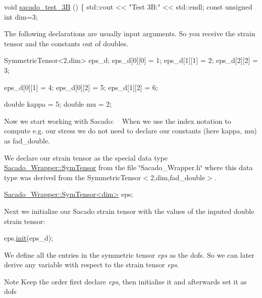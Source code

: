 \begin{DoxyCode}
\textcolor{keywordtype}{void} \hyperlink{Sacado__example_8cc_ae63cc8526935cb0512668e83cfc7b929}{sacado\_test\_3B} ()
\{
    std::cout << \textcolor{stringliteral}{"Test 3B:"} << std::endl;
    \textcolor{keyword}{const} \textcolor{keywordtype}{unsigned} \textcolor{keywordtype}{int} dim=3;
\end{DoxyCode}
 The following declarations are usually input arguments. So you receive the strain tensor and the constants out of doubles. 
\begin{DoxyCode}
SymmetricTensor<2,dim> eps\_d;
eps\_d[0][0] = 1;
eps\_d[1][1] = 2;
eps\_d[2][2] = 3;

eps\_d[0][1] = 4;
eps\_d[0][2] = 5;
eps\_d[1][2] = 6;

\textcolor{keywordtype}{double} kappa = 5;
\textcolor{keywordtype}{double} mu = 2;
\end{DoxyCode}
 Now we start working with Sacado\+: ~\newline
When we use the index notation to compute e.\+g. our stress we do not need to declare our constants (here kappa, mu) as fad\+\_\+double.

We declare our strain tensor as the special data type \hyperlink{classSacado__Wrapper_1_1SymTensor}{Sacado\+\_\+\+Wrapper\+::\+Sym\+Tensor} from the file \char`\"{}\+Sacado\+\_\+\+Wrapper.\+h\char`\"{} where this data type was derived from the Symmetric\+Tensor$<$2,dim,fad\+\_\+double$>$. 
\begin{DoxyCode}
\hyperlink{classSacado__Wrapper_1_1SymTensor}{Sacado\_Wrapper::SymTensor<dim>} eps;
\end{DoxyCode}
 Next we initialize our Sacado strain tensor with the values of the inputed double strain tensor\+: 
\begin{DoxyCode}
eps.\hyperlink{classSacado__Wrapper_1_1SymTensor_acbad579d5ead9e96ff46aa15d9b5aef4}{init}(eps\_d);
\end{DoxyCode}
 We define all the entries in the symmetric tensor {\itshape eps} as the dofs. So we can later derive any variable with respect to the strain tensor {\itshape eps}. \begin{DoxyNote}{Note}
Keep the order first declare {\itshape eps}, then initialise it and afterwards set it as dofs
\end{DoxyNote}


